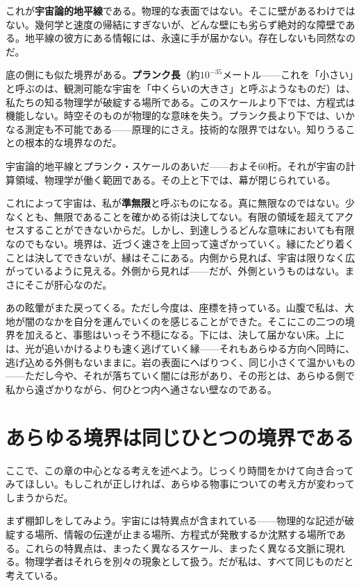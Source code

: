 \documentclass[11pt, twoside, openright]{book}
\begin{document}
これが\textbf{宇宙論的地平線}である。物理的な表面ではない。そこに壁があるわけではない。幾何学と速度の帰結にすぎないが、どんな壁にも劣らず絶対的な障壁である。地平線の彼方にある情報には、永遠に手が届かない。存在しないも同然なのだ。

底の側にも似た境界がある。\textbf{プランク長}（約$10^{-35}$メートル------これを「小さい」と呼ぶのは、観測可能な宇宙を「中くらいの大きさ」と呼ぶようなものだ）は、私たちの知る物理学が破綻する場所である。このスケールより下では、方程式は機能しない。時空そのものが物理的な意味を失う。プランク長より下では、いかなる測定も不可能である------原理的にさえ。技術的な限界ではない。知りうることの根本的な境界なのだ。

宇宙論的地平線とプランク・スケールのあいだ------およそ60桁。それが宇宙の計算領域、物理学が働く範囲である。その上と下では、幕が閉じられている。

これによって宇宙は、私が\textbf{準無限}と呼ぶものになる。真に無限なのではない。少なくとも、無限であることを確かめる術は決してない。有限の領域を超えてアクセスすることができないからだ。しかし、到達しうるどんな意味においても有限なのでもない。境界は、近づく速さを上回って遠ざかっていく。縁にたどり着くことは決してできないが、縁はそこにある。内側から見れば、宇宙は限りなく広がっているように見える。外側から見れば------だが、外側というものはない。まさにそこが肝心なのだ。

あの眩暈がまた戻ってくる。ただし今度は、座標を持っている。山腹で私は、大地が闇のなかを自分を運んでいくのを感じることができた。そこにこの二つの境界を加えると、事態はいっそう不穏になる。下には、決して届かない床。上には、光が追いかけるよりも速く逃げていく縁------それもあらゆる方向へ同時に、逃げ込める外側もないままに。岩の表面にへばりつく、同じ小さくて温かいもの------ただし今や、それが落ちていく闇には形があり、その形とは、あらゆる側で私から遠ざかりながら、何ひとつ内へ通さない壁なのである。


\section*{あらゆる境界は同じひとつの境界である}

ここで、この章の中心となる考えを述べよう。じっくり時間をかけて向き合ってみてほしい。もしこれが正しければ、あらゆる物事についての考え方が変わってしまうからだ。

まず棚卸しをしてみよう。宇宙には特異点が含まれている------物理的な記述が破綻する場所、情報の伝達が止まる場所、方程式が発散するか沈黙する場所である。これらの特異点は、まったく異なるスケール、まったく異なる文脈に現れる。物理学者はそれらを別々の現象として扱う。だが私は、すべて同じものだと考えている。
\end{document}
